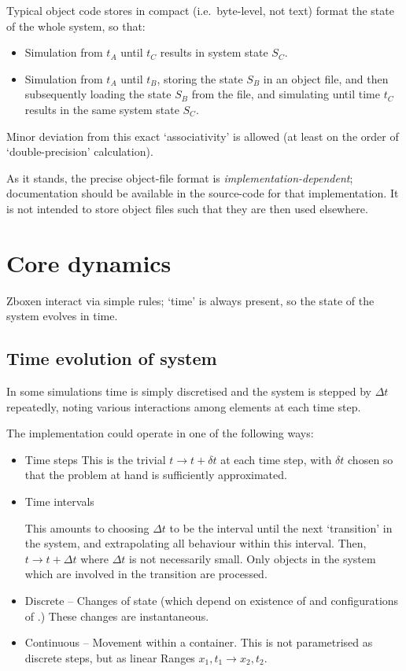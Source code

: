 Typical object code stores in compact (i.e.~byte-level, not text) format the state of the whole system,
so that:
\begin{itemize}
\item Simulation from $t_A$  until $t_C$ results in system state $S_C$.
\item Simulation from $t_A$ until $t_B$, storing the state $S_B$ in an object file, and
  then subsequently loading the state $S_B$ from the file, and simulating until time $t_C$
  results in the same system state $S_C$.
\end{itemize}
Minor deviation from this exact `associativity' is allowed (at least
on the order of `double-precision' calculation).

As it stands, the precise object-file format
is \emph{implementation-dependent}; documentation should be available
in the source-code for that implementation. It is not intended to
store object files such that they are then used elsewhere.

\section{Core dynamics}
\label{core}

Zboxen interact via simple rules; `time' is always present, so the state of
the system evolves in time.

\subsection{Time evolution of system}

In some simulations time is simply discretised and the system is
stepped by $\Delta t$ repeatedly, noting various interactions among
elements at each time step.

The implementation could operate in one of the following ways:

\begin{itemize}

\item Time steps
  This is the trivial $t \rightarrow t + \delta t$ at each time step,
  with $\delta t $ chosen so that the problem at hand is sufficiently approximated. 
  
\item Time intervals

This amounts to choosing $\Delta t$ to be the interval until the next `transition'
in the system, and extrapolating all behaviour within this interval. Then,
$t \rightarrow t + \Delta t$ where $\Delta t$ is not necessarily small.
Only objects in the system which are involved in the transition are processed.
  
\item Discrete -- Changes of state (which depend on existence of
   and configurations of .) These changes
  are instantaneous.

\item Continuous -- Movement within a container. This is not
  parametrised as discrete steps, but as linear Ranges $x_1,t_1
  \rightarrow x_2,t_2$.
\end{itemize}

